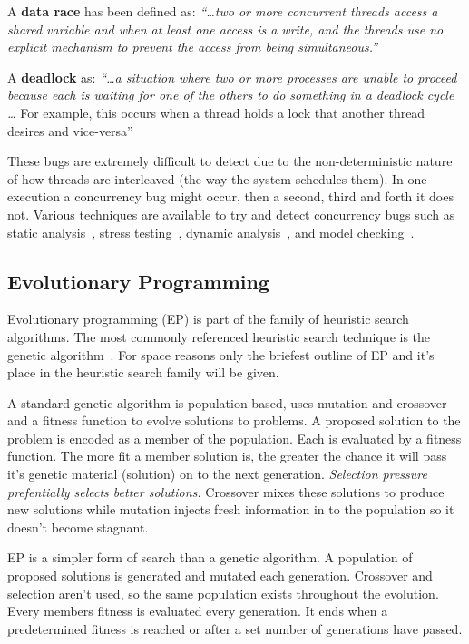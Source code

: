 \documentclass[10pt, conference, compsocconf]{IEEEtran}
\begin{document}
A \textbf{data race} has been defined as: \textit{``\ldots two or more
concurrent threads access a shared variable and when at least one access is a
write, and the threads use no explicit mechanism to prevent the access from
being simultaneous.''}~\cite{LSW07}

A \textbf{deadlock} as: \textit{``\ldots a situation where two
or more processes are unable to proceed because each is waiting for one of the
others to do something in a deadlock cycle \ldots} For example, this occurs
when a thread holds a lock that another thread desires and
vice-versa''~\cite{LSW07}

These bugs are extremely difficult to detect due to the non-deterministic
nature of how threads are interleaved (the way the system schedules them).
In one execution a concurrency bug might occur, then a second, third and forth
it does not. Various techniques are available to try and detect concurrency
bugs such as static analysis~\cite{NA07,NPSG09,HP04}, stress
testing~\cite{HSU03}, dynamic analysis~\cite{JNPS09,EFN+02}, and model
checking~\cite{BHPV00,RDH03,OM03,MQB07,Holz97,JM04,BHPV00,HP00}.

\subsection{Evolutionary Programming}

Evolutionary programming (EP) is part of the family of heuristic search algorithms.
The most commonly referenced heuristic search technique is the genetic
algorithm~\cite{GA92}. For space reasons only the briefest outline of EP and it's
place in the heuristic search family will be given.

A standard genetic algorithm is population based, uses mutation and crossover and a
fitness function to evolve solutions to problems. A proposed solution to the problem
is encoded as a member of the population. Each is evaluated by a fitness function.  
The more fit a member solution is, the greater the chance it will pass it's genetic
material (solution) on to the next generation. \textit{Selection pressure prefentially selects better solutions.}
Crossover mixes these solutions to produce new solutions while mutation injects fresh
information in to the population so it doesn't become stagnant.

EP is a simpler form of search than a genetic algorithm. A population of proposed
solutions is generated and mutated each generation.  Crossover and selection aren't
used, so the same population exists throughout the evolution. Every members fitness
is evaluated every generation. It ends when a predetermined fitness is reached or
after a set number of generations have passed.
\end{document}

